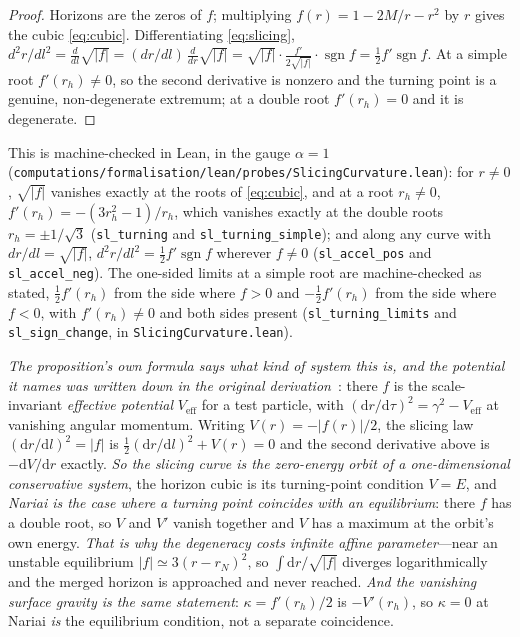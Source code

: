 \documentclass[11pt,a4paper]{article}
\theoremstyle{definition}
\newcommand{\dd}{\mathrm{d}}   %
\begin{document}
\begin{proof}
Horizons are the zeros of $f$; multiplying $f(r)=1-2M/r-r^{2}$ by $r$ gives the cubic \eqref{eq:cubic}. Differentiating \eqref{eq:slicing}, $d^{2}r/dl^{2}=\tfrac{d}{dl}\sqrt{|f|}=(dr/dl)\,\tfrac{d}{dr}\sqrt{|f|}=\sqrt{|f|}\cdot\tfrac{f'}{2\sqrt{|f|}}\cdot\operatorname{sgn} f=\tfrac12 f'\operatorname{sgn} f$. At a simple root $f'(r_{h})\neq0$, so the second derivative is nonzero and the turning point is a genuine, non-degenerate extremum; at a double root $f'(r_{h})=0$ and it is degenerate.
\end{proof}

This is machine-checked in Lean, in the gauge $\alpha=1$ (\texttt{computations/formalisation/lean/probes/SlicingCurvature.lean}): for $r\neq0$, $\sqrt{\lvert f\rvert}$ vanishes exactly at the roots of \eqref{eq:cubic}, and at a root $r_{h}\neq0$, $f'(r_{h})=-(3r_{h}^{2}-1)/r_{h}$, which vanishes exactly at the double roots $r_{h}=\pm1/\sqrt3$ (\texttt{sl\_turning} and \texttt{sl\_turning\_simple}); and along any curve with $dr/dl=\sqrt{\lvert f\rvert}$, $d^{2}r/dl^{2}=\tfrac12 f'\operatorname{sgn}f$ wherever $f\neq0$ (\texttt{sl\_accel\_pos} and \texttt{sl\_accel\_neg}). The one-sided limits at a simple root are machine-checked as stated, $\tfrac12f'(r_{h})$ from the side where $f>0$ and $-\tfrac12f'(r_{h})$ from the side where $f<0$, with $f'(r_{h})\neq0$ and both sides present (\texttt{sl\_turning\_limits} and \texttt{sl\_sign\_change}, in \texttt{SlicingCurvature.lean}).

\emph{The proposition's own formula says what kind of system this is, and the potential it names was written down in the original derivation}~\cite[Eqs.~(4.24), Fig.~4.3]{JanzenThesis}: there $f$ is the scale-invariant \emph{effective potential} $V_{\mathrm{eff}}$ for a test particle, with $(\dd r/\dd\tau)^{2}=\gamma^{2}-V_{\mathrm{eff}}$ at vanishing angular momentum. Writing $V(r)=-\lvert f(r)\rvert/2$, the slicing law $(\dd r/\dd l)^{2}=\lvert f\rvert$ is $\tfrac12(\dd r/\dd l)^{2}+V(r)=0$ and the second derivative above is $-\dd V/\dd r$ exactly. \emph{So the slicing curve is the zero-energy orbit of a one-dimensional conservative system}, the horizon cubic is its turning-point condition $V=E$, and \emph{Nariai is the case where a turning point coincides with an equilibrium}: there $f$ has a double root, so $V$ and $V'$ vanish together and $V$ has a maximum at the orbit's own energy. \emph{That is why the degeneracy costs infinite affine parameter}---near an unstable equilibrium $\lvert f\rvert\simeq3(r-r_{N})^{2}$, so $\int\dd r/\sqrt{\lvert f\rvert}$ diverges logarithmically and the merged horizon is approached and never reached. \emph{And the vanishing surface gravity is the same statement}: $\kappa=f'(r_h)/2$ is $-V'(r_h)$, so $\kappa=0$ at Nariai \emph{is} the equilibrium condition, not a separate coincidence.
\end{document}

